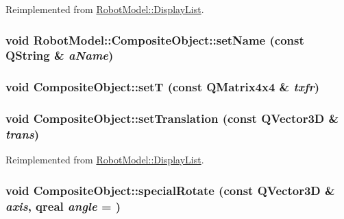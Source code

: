 Reimplemented from \hyperlink{class_robot_model_1_1_display_list_a7d52ea010f54755bcb3bfae9e26dd0c2}{RobotModel::DisplayList}.\hypertarget{class_robot_model_1_1_composite_object_a02a2c1ee58297a6ea0131fa808498a49}{
\subsubsection[{setName}]{\setlength{\rightskip}{0pt plus 5cm}void RobotModel::CompositeObject::setName (const QString \& {\em aName})}}
\label{class_robot_model_1_1_composite_object_a02a2c1ee58297a6ea0131fa808498a49}
\hypertarget{class_robot_model_1_1_composite_object_abd48ac40b21178f5306ddfa6c92ea3c3}{
\subsubsection[{setT}]{\setlength{\rightskip}{0pt plus 5cm}void CompositeObject::setT (const QMatrix4x4 \& {\em txfr})}}
\label{class_robot_model_1_1_composite_object_abd48ac40b21178f5306ddfa6c92ea3c3}
\hypertarget{class_robot_model_1_1_composite_object_ae925e59246174c9d3b74d459b32835e3}{
\subsubsection[{setTranslation}]{\setlength{\rightskip}{0pt plus 5cm}void CompositeObject::setTranslation (const QVector3D \& {\em trans})}}
\label{class_robot_model_1_1_composite_object_ae925e59246174c9d3b74d459b32835e3}


Reimplemented from \hyperlink{class_robot_model_1_1_display_list_a6c9c1298e237ab25037ad9d7163b118c}{RobotModel::DisplayList}.\hypertarget{class_robot_model_1_1_composite_object_ad44b9c1759209367754dafd77c984d6f}{
\subsubsection[{specialRotate}]{\setlength{\rightskip}{0pt plus 5cm}void CompositeObject::specialRotate (const QVector3D \& {\em axis}, \/  qreal {\em angle} = {})}}
\label{class_robot_model_1_1_composite_object_ad44b9c1759209367754dafd77c984d6f}


